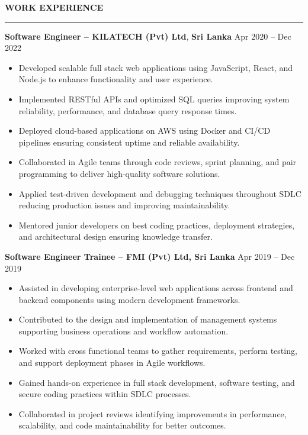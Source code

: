 \documentclass[10pt,letterpaper]{article}
\begin{document}
\textbf{WORK EXPERIENCE}\\[-8pt]
\noindent\rule{\textwidth}{1pt}

\vspace{-2pt}

\textbf{Software Engineer -- KILATECH (Pvt) Ltd}, \textbf{Sri Lanka} \hfill Apr 2020 -- Dec 2022

\vspace{-1pt}

\begin{itemize}
\item Developed scalable full stack web applications using JavaScript, React, and Node.js to enhance functionality and user experience.
\item Implemented RESTful APIs and optimized SQL queries improving system reliability, performance, and database query response times.
\item Deployed cloud-based applications on AWS using Docker and CI/CD pipelines ensuring consistent uptime and reliable availability.
\item Collaborated in Agile teams through code reviews, sprint planning, and pair programming to deliver high-quality software solutions.
\item Applied test-driven development and debugging techniques throughout SDLC reducing production issues and improving maintainability.
\item Mentored junior developers on best coding practices, deployment strategies, and architectural design ensuring knowledge transfer.
\end{itemize}

\textbf{Software Engineer Trainee -- FMI (Pvt) Ltd, Sri Lanka} \hfill Apr 2019 -- Dec 2019

\vspace{-1pt}

\begin{itemize}
\item Assisted in developing enterprise-level web applications across frontend and backend components using modern development frameworks.
\item Contributed to the design and implementation of management systems supporting business operations and workflow automation.
\item Worked with cross functional teams to gather requirements, perform testing, and support deployment phases in Agile workflows.
\item Gained hands-on experience in full stack development, software testing, and secure coding practices within SDLC processes.
\item Collaborated in project reviews identifying improvements in performance, scalability, and code maintainability for better outcomes.
\end{itemize}
\end{document}
